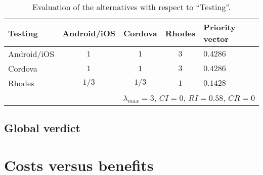 \begin{table}[h!]
    \begin{center}
        \begin{tabular}{lcccl}
            \hline
            \textbf{Testing} & Android/iOS & Cordova & Rhodes & Priority vector \\
            \hline
            Android/iOS      & $1$         & $1$     & $3$    & $0.4286$ \\
            Cordova          & $1$         & $1$     & $3$    & $0.4286$ \\
            Rhodes           & $1/3$       & $1/3$   & $1$    & $0.1428$ \\
            \hline
            \multicolumn{5}{r}{$\lambda_{max} = 3$, $CI = 0$, $RI = 0.58$, $CR = 0$}\\
            \hline
        \end{tabular}
        \caption{Evaluation of the alternatives with respect to ``Testing''.}
        \label{tab:testing}
    \end{center}
\end{table}

\subsection*{Global verdict}




\section{Costs versus benefits}















